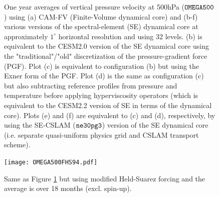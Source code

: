 \documentclass[draft]{agujournal2019}
\begin{document}
\begin{figure}[t]
\caption{One year averages of vertical pressure velocity at 500hPa ($\tt OMEGA500$) using (a) CAM-FV (Finite-Volume dynamical core) and (b-f) various versions of the spectral-element (SE) dynamical core at approximately $1^{\circ}$ horizontal resolution and using 32 levels. (b) is equivalent to the CESM2.0 version of the SE dynamical core using the "traditional"/"old" discretization of the pressure-gradient force (PGF). Plot (c) is equivalent to configuration (b) but using the Exner form of the PGF. Plot (d) is the same as configuration (c) but also subtracting reference profiles from pressure and temperature before applying hyperviscosity operators (which is equivalent to the CESM2.2 version of SE in terms of the dynamical core). Plots (e) and (f) are equivalent to (c) and (d), respectively, by using the SE-CSLAM ($\tt ne30pg3$) version of the SE dynamical core (i.e. separate quasi-uniform physics grid and CSLAM transport scheme).}\label{fig:OMEGA500}
\end{figure}
\begin{figure}[t]
\begin{center}
\texttt{[image: OMEGA500FHS94.pdf]}
\end{center}
\caption{Same as Figure \ref{fig:OMEGA500} but using modified Held-Suarez forcing and the average is over 18 months (excl. spin-up).}\label{fig:OMEGA500FHS94}
\end{figure}

%
%

%

%
\end{document}
